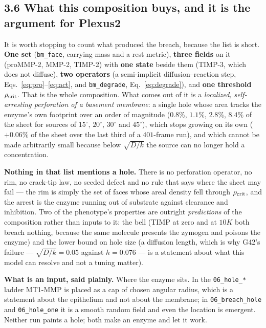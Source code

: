 \documentclass[10pt,a4paper]{article}
\newcommand{\code}[1]{\texttt{#1}}
\newcommand{\op}[1]{\texttt{#1}}
\begin{document}
\subsection*{3.6\; What this composition buys, and it is the argument for Plexus2}

It is worth stopping to count what produced the breach, because the list is short. \textbf{One set}
(\code{bm\_face}, carrying mass and a rest metric), \textbf{three fields} on it (proMMP-2, MMP-2,
TIMP-2) with \textbf{one state} beside them (TIMP-3, which does not diffuse), \textbf{two operators}
(a semi-implicit diffusion--reaction step, Eqs.~\eqref{eq:pro}--\eqref{eq:act}, and
\op{bm\_degrade}, Eq.~\eqref{eq:degrade}), and \textbf{one threshold} $\rho_{\rm crit}$. That is the
whole composition. What comes out of it is a \emph{localized, self-arresting perforation of a basement
membrane}: a single hole whose area tracks the enzyme's own footprint over an order of magnitude
($0.8\%$, $1.1\%$, $2.8\%$, $8.4\%$ of the sheet for sources of $15^\circ$, $20^\circ$, $30^\circ$ and
$45^\circ$), which stops growing on its own ($+0.06\%$ of the sheet over the last third of a
$401$-frame run), and which cannot be made arbitrarily small because below $\sqrt{D/k}$ the source can
no longer hold a concentration.

\textbf{Nothing in that list mentions a hole.} There is no perforation operator, no rim, no crack-tip
law, no seeded defect and no rule that says where the sheet may fail --- the rim is simply the set of
faces whose areal density fell through $\rho_{\rm crit}$, and the arrest is the enzyme running out of
substrate against clearance and inhibition. Two of the phenotype's properties are outright
\emph{predictions} of the composition rather than inputs to it: the bell (TIMP at zero and at $10K$
both breach nothing, because the same molecule presents the zymogen and poisons the enzyme) and the
lower bound on hole size (a diffusion length, which is why G42's failure --- $\sqrt{D/k}=0.05$ against
$h=0.076$ --- is a statement about what this model can resolve and not a tuning matter).

\textbf{What is an input, said plainly.} Where the enzyme sits. In the \op{06\_hole\_*} ladder MT1-MMP
is placed as a cap of chosen angular radius, which is a statement about the epithelium and not about
the membrane; in \op{06\_breach\_hole} and \op{06\_hole\_one} it is a smooth random field and even the
location is emergent. Neither run paints a hole; both make an enzyme and let it work.
\end{document}
